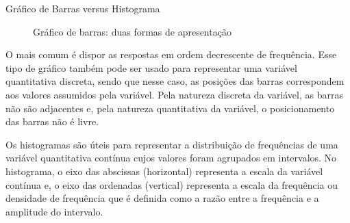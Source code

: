 {\begin{observation}{Gráfico de Barras versus Histograma}
\begin{figure}[H]
\begin{minipage}{0.4\textwidth}
\begin{figure}[H]
\end{figure}
\end{minipage}

\caption{Gráfico de barras: duas formas de apresentação}
\label{est1-fig-20}
\end{figure}

O mais comum é dispor as respostas em ordem decrescente de frequência. Esse tipo de gráfico também pode ser usado para representar uma variável quantitativa discreta, sendo que nesse caso, as posições das barras correspondem aos valores assumidos pela variável. Pela natureza discreta da variável, as barras não são adjacentes e, pela natureza quantitativa da variável, o posicionamento das barras não é livre.

Os histogramas são úteis para representar a distribuição de frequências de uma variável quantitativa contínua cujos valores foram agrupados em intervalos. No histograma, o eixo das abscissas (horizontal) representa a escala da variável contínua e, o eixo das ordenadas (vertical) representa a escala da frequência ou densidade de frequência que é definida como a razão entre a frequência e a amplitude do intervalo.

\begin{figure}[H]
\centering
\capstart

\noindent

\end{figure}
\end{observation}}
